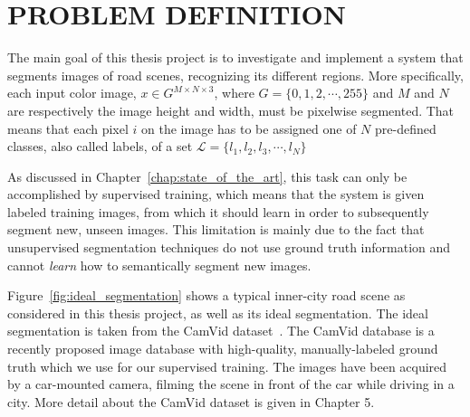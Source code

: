 \documentclass[a4paper, 10pt, conference]{ieeeconf}      %
\begin{document}


\section{PROBLEM DEFINITION}

The main goal of this thesis project is to investigate and implement a system that segments images of road scenes, recognizing its different regions. More specifically, each input color image, $x \in G^{M\times N\times 3}$, where $G = \{ 0, 1, 2, \cdots, 255\}$ and $M$ and $N$ are respectively the image height and width, must be pixelwise segmented. That means that each pixel $i$ on the image has to be assigned one of $N$ pre-defined classes, also called labels, of a set $\mathcal L = \{ l_1, l_2, l_3, \cdots, l_N\}$

As discussed in Chapter~\ref{chap:state_of_the_art}, this task can only be accomplished by supervised training, which means that the system is given labeled training images, from which it should learn in order to subsequently segment new, unseen images. This limitation is mainly due to the fact that unsupervised segmentation techniques do not use ground truth information and cannot \emph{learn} how to semantically segment new images.

Figure~\ref{fig:ideal_segmentation} shows a typical inner-city road scene as considered in this thesis project, as well as its ideal segmentation. The ideal segmentation is taken from the CamVid dataset~\cite{brostow:camvid}. The CamVid database is a recently proposed image database with high-quality, manually-labeled ground truth which we use for our supervised training. The images have been acquired by a car-mounted camera, filming the scene in front of the car while driving in a city. More detail about the CamVid dataset is given in Chapter 5.
\end{document}
